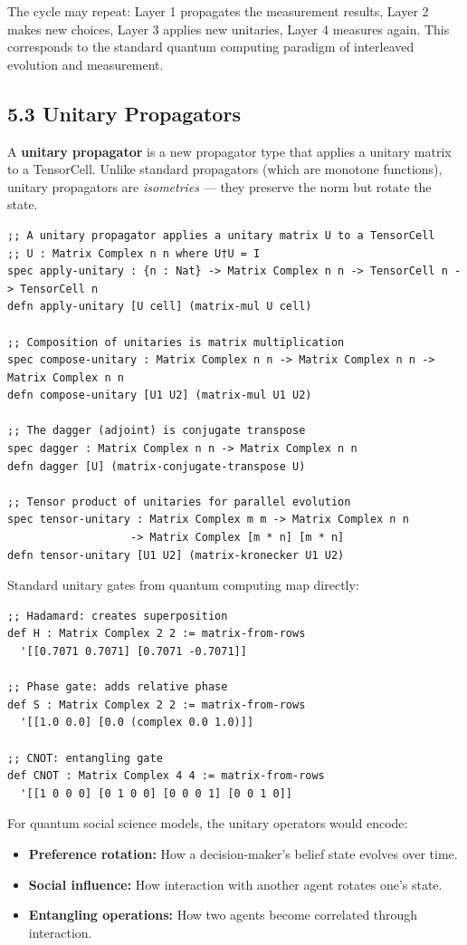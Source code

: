 \documentclass[11pt]{article}
\begin{document}
The cycle may repeat: Layer 1 propagates the measurement results, Layer 2 makes
new choices, Layer 3 applies new unitaries, Layer 4 measures again. This
corresponds to the standard quantum computing paradigm of interleaved evolution
and measurement.
\subsection{5.3 Unitary Propagators}
\label{sec:orgc21177a}

A \textbf{unitary propagator} is a new propagator type that applies a unitary matrix to
a TensorCell. Unlike standard propagators (which are monotone functions), unitary
propagators are \emph{isometries} --- they preserve the norm but rotate the state.

\begin{verbatim}
;; A unitary propagator applies a unitary matrix U to a TensorCell
;; U : Matrix Complex n n where U†U = I
spec apply-unitary : {n : Nat} -> Matrix Complex n n -> TensorCell n -> TensorCell n
defn apply-unitary [U cell] (matrix-mul U cell)

;; Composition of unitaries is matrix multiplication
spec compose-unitary : Matrix Complex n n -> Matrix Complex n n -> Matrix Complex n n
defn compose-unitary [U1 U2] (matrix-mul U1 U2)

;; The dagger (adjoint) is conjugate transpose
spec dagger : Matrix Complex n n -> Matrix Complex n n
defn dagger [U] (matrix-conjugate-transpose U)

;; Tensor product of unitaries for parallel evolution
spec tensor-unitary : Matrix Complex m m -> Matrix Complex n n
                   -> Matrix Complex [m * n] [m * n]
defn tensor-unitary [U1 U2] (matrix-kronecker U1 U2)
\end{verbatim}

Standard unitary gates from quantum computing map directly:

\begin{verbatim}
;; Hadamard: creates superposition
def H : Matrix Complex 2 2 := matrix-from-rows
  '[[0.7071 0.7071] [0.7071 -0.7071]]

;; Phase gate: adds relative phase
def S : Matrix Complex 2 2 := matrix-from-rows
  '[[1.0 0.0] [0.0 (complex 0.0 1.0)]]

;; CNOT: entangling gate
def CNOT : Matrix Complex 4 4 := matrix-from-rows
  '[[1 0 0 0] [0 1 0 0] [0 0 0 1] [0 0 1 0]]
\end{verbatim}

For quantum social science models, the unitary operators would encode:
\begin{itemize}
\item \textbf{Preference rotation:} How a decision-maker's belief state evolves over time.
\item \textbf{Social influence:} How interaction with another agent rotates one's state.
\item \textbf{Entangling operations:} How two agents become correlated through interaction.
\end{itemize}
\end{document}
